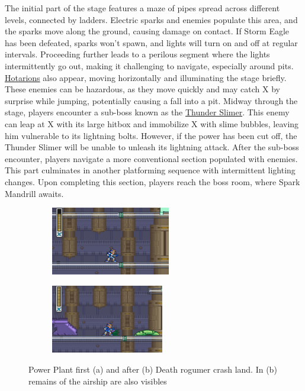 The initial part of the stage features a maze of pipes spread across different levels, connected by ladders. Electric sparks and enemies populate this area, and the sparks move along the ground, causing damage on contact. If Storm Eagle has been defeated, sparks won't spawn, and lights will turn on and off at regular intervals. Proceeding further leads to a perilous segment where the lights intermittently go out, making it challenging to navigate, especially around pits. \hyperlink{enem:Hotarion}{Hotarions} also appear, moving horizontally and illuminating the stage briefly. These enemies can be hazardous, as they move quickly and may catch X by surprise while jumping, potentially causing a fall into a pit. Midway through the stage, players encounter a sub-boss known as the \hyperlink{miniboss:Thunder_Slimer}{Thunder Slimer}. This enemy can leap at X with its large hitbox and immobilize X with slime bubbles, leaving him vulnerable to its lightning bolts. However, if the power has been cut off, the Thunder Slimer will be unable to unleash its lightning attack. After the sub-boss encounter, players navigate a more conventional section populated with enemies. This part culminates in another platforming sequence with intermittent lighting changes. Upon completing this section, players reach the boss room, where Spark Mandrill awaits.
\begin{figure}[htp]
	\centering
	\begin{subfigure}{0.45\linewidth}
		\centering
		\includegraphics[height=3cm]{figures/X1/Spark_mandrill/Mandrill_power.jpg}
		\caption{}
	\end{subfigure}
	\begin{subfigure}{0.45\linewidth}
		\centering
		\includegraphics[height=3cm]{figures/X1/Spark_mandrill/Mandrill_no_power.jpg}
		\caption{}
	\end{subfigure}
	\caption{Power Plant first (a) and after (b) Death rogumer crash land. In (b) remains of the airship are also visibles}
\end{figure}

